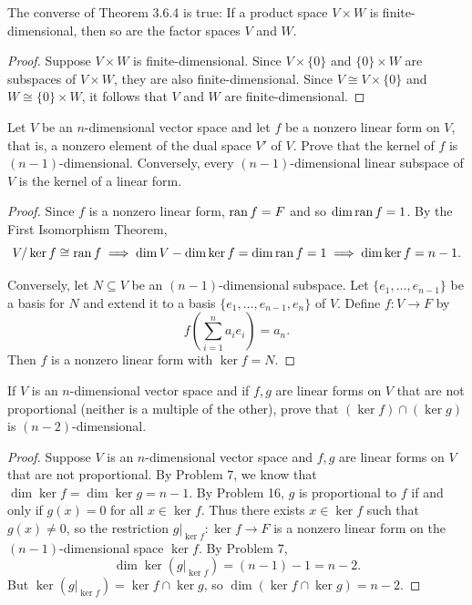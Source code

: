 \begin{tcolorbox}[title=Problem 6, breakable]
    The converse of Theorem 3.6.4 is true: If a product space $V \times W$
    is finite-dimensional, then so are the factor spaces $V$ and $W$.
\end{tcolorbox}

\begin{proof}
    Suppose $V \times W$ is finite-dimensional. Since $V \times \{0\}$ and 
    $\{0\} \times W$ are subspaces of $V \times W$, they are also finite-dimensional.
    Since $V \cong V \times \{0\}$ and $W \cong \{0\} \times W$, it follows that 
    $V$ and $W$ are finite-dimensional.
\end{proof}

\begin{tcolorbox}[title=Problem 7, breakable]
    Let $V$ be an $n$-dimensional vector space and let $f$ 
    be a nonzero linear form on $V$, that is, a nonzero element of the 
    dual space $V'$ of $V$. Prove that the kernel of $f$ is $(n - 1)$-dimensional.
    Conversely, every $(n - 1)$-dimensional linear subspace of $V$ is the kernel of a linear form.
\end{tcolorbox}

\begin{proof}
    Since $f$ is a nonzero linear form, $\operatorname{ran} f = F$ and so $\dim \operatorname{ran} f = 1$.
    By the First Isomorphism Theorem,
    \[V / \ker f \cong \operatorname{ran} f \implies \dim V - \dim \ker f = \dim \operatorname{ran} f = 1 \implies \dim \ker f = n - 1.\]
    
    Conversely, let $N \subseteq V$ be an $(n-1)$-dimensional subspace. 
    Let $\{e_1, \ldots, e_{n-1}\}$ be a basis for $N$ and extend it to a basis 
    $\{e_1, \ldots, e_{n-1}, e_n\}$ of $V$. Define $f : V \to F$ by 
    \[f\left(\sum_{i=1}^n a_i e_i\right) = a_n.\]
    Then $f$ is a nonzero linear form with $\ker f = N$.
\end{proof}


\begin{tcolorbox}[title=Problem 8, breakable]
    If $V$ is an $n$-dimensional vector space and if $f, g$ are linear forms on $V$
    that are not proportional (neither is a multiple of the other), prove that 
    $(\ker f) \cap (\ker g)$ is $(n - 2)$-dimensional.
\end{tcolorbox}

\begin{proof}
    Suppose $V$ is an $n$-dimensional vector space and $f, g$ are linear forms on $V$
    that are not proportional.
    By Problem 7, we know that $\dim \ker f = \dim \ker g = n - 1$.
    By Problem 16, $g$ is proportional to $f$ if and only if $g(x) = 0$ for all $x \in \ker f$.
    Thus there exists $x \in \ker f$ such that $g(x) \ne 0$, so the restriction 
    $g|_{\ker f} : \ker f \to F$ is a nonzero linear form on the $(n-1)$-dimensional 
    space $\ker f$. By Problem 7,
    \[\dim \ker(g|_{\ker f}) = (n - 1) - 1 = n - 2.\]
    But $\ker(g|_{\ker f}) = \ker f \cap \ker g$, so $\dim(\ker f \cap \ker g) = n - 2$.
\end{proof}

